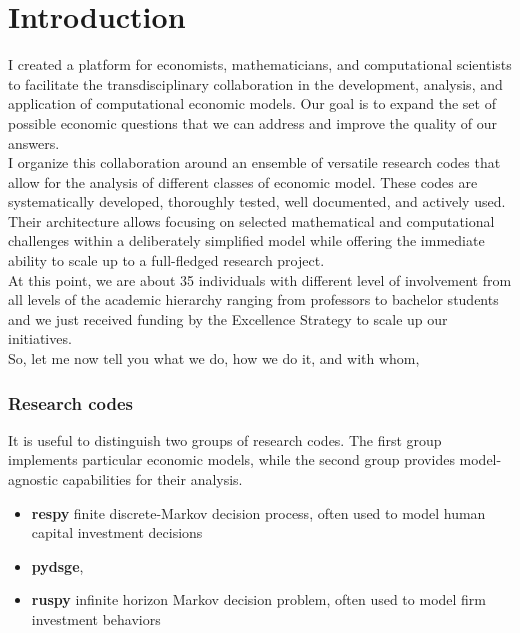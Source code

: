 \section{Introduction}
I created a platform for economists, mathematicians, and computational scientists to facilitate the transdisciplinary collaboration in the development, analysis, and application of computational economic models. Our goal is to expand the set of possible economic questions that we can address and improve the quality of our answers.\\

\noindent I organize this collaboration around an ensemble of versatile research codes that allow for the analysis of different classes of economic model. These codes are systematically developed, thoroughly tested, well documented, and actively used. Their architecture allows focusing on selected mathematical and computational challenges within a deliberately simplified model while offering the immediate ability to scale up to a full-fledged research project.\\

\noindent At this point, we are about 35 individuals with different level of involvement from all levels of the academic hierarchy ranging from professors to bachelor students and we just received funding by the Excellence Strategy to scale up our initiatives.\\

\noindent So, let me now tell you what we do, how we do it, and with whom,

\subsubsection*{Research codes}

It is useful to distinguish two groups of research codes. The first group implements particular economic models, while the second group provides model-agnostic capabilities for their analysis.

\begin{itemize}
\item \textbf{respy} finite discrete-Markov decision process, often used to model human capital investment decisions
\item \textbf{pydsge},
\item \textbf{ruspy} infinite horizon Markov decision problem, often used to model firm investment behaviors
\end{itemize}

